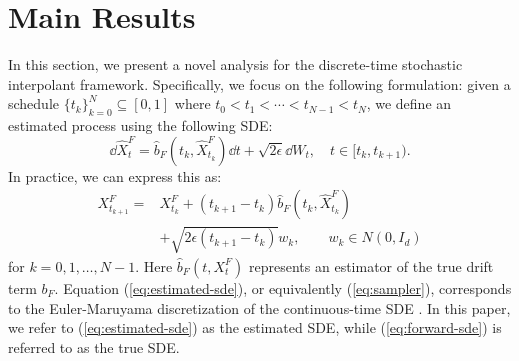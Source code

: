 
\section{Main Results}
\label{sec:results}









In this section, we present a novel analysis for the discrete-time stochastic interpolant framework. Specifically, we focus on the following formulation: given a schedule $\{t_k\}_{k=0}^N\subseteq[0,1]$ where $t_0<t_1<\cdots<t_{N-1}<t_N$, we define an estimated process using the following SDE: 
\begin{equation}
\dd\hat{X}_t^F=\hat{b}_F(t_k,\hat{X}_{t_k}^F)\dd t+\sqrt{2\epsilon}\dd W_t,\quad t\in[t_k,t_{k+1}).
\label{eq:estimated-sde}
\end{equation}
In practice, we can express this as:
\begin{equation}
    \begin{aligned}
        X_{t_{k+1}}^F=&X_{t_k}^F+(t_{k+1}-t_k)\hat{b}_F(t_k,\hat{X}_{t_k}^F)\\
        &+\sqrt{2\epsilon(t_{k+1}-t_k)}w_k,\qquad w_k\in N(0,I_d)
    \end{aligned}
    \label{eq:sampler}
\end{equation}
for $k=0,1,\dots,N-1$. 
Here $\hat{b}_F(t,X_t^F)$ represents an estimator of the true drift term $b_F$. 
Equation (\ref{eq:estimated-sde}), or equivalently (\ref{eq:sampler}), corresponds to the Euler-Maruyama discretization of the continuous-time SDE \cite{chen2023improved,chen2023score}. In this paper, we refer to (\ref{eq:estimated-sde}) as the estimated SDE, while (\ref{eq:forward-sde}) is referred to as the true SDE.


